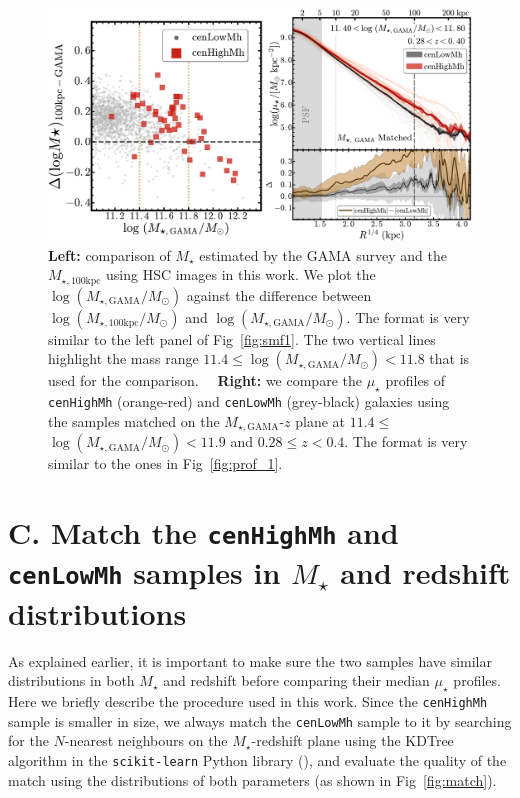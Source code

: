 \documentclass[a4paper,fleqn,usenatbib]{mnras}
\def\rbcg{\texttt{cenHighMh}}
\def\nbcg{\texttt{cenLowMh}}
\def\mstar{{$M_{\star}$}}
\def\mtot{{$M_{\star,100\mathrm{kpc}}$}}
\def\mgama{{$M_{\star,\mathrm{GAMA}}$}}
\def\logmtot{{$\log (M_{\star,100\mathrm{kpc}}/M_{\odot})$}}
\def\logmgama{{$\log (M_{\star,\mathrm{GAMA}}/M_{\odot})$}}
\def\mden{{$\mu_{\star}$}}
\begin{document}
\begin{figure}
    \centering
    \includegraphics[width=16cm]{fig/redbcg_prof_gama_new}
    \caption{
        \textbf{Left:} comparison of \mstar{} estimated by the GAMA survey and 
        the \mtot{} using HSC images in this work. 
        We plot the \logmgama{} against the difference between \logmtot{} and \logmgama{}. 
        The format is very similar to the left panel of Fig~\ref{fig:smf1}. 
        The two vertical lines highlight the mass range $11.4 \leq$\logmgama{}$<11.8$ 
        that is used for the comparison.~~
        \textbf{Right:} we compare the \mden{} profiles of \rbcg{} (orange-red) and 
        \nbcg{} (grey-black) galaxies using the samples matched on the 
        \mgama{}-$z$ plane at $11.4 \leq$\logmgama{}$<11.9$ and $0.28 \leq z < 0.4$. 
        The format is very similar to the ones in Fig~\ref{fig:prof_1}.}
    \label{fig:gama}
\end{figure}

\section{C. Match the \rbcg{} and \nbcg{} samples in \mstar{} and redshift distributions}
    \label{app:match}

    As explained earlier, it is important to make sure the two samples have similar 
    distributions in both \mstar{} and redshift before comparing their median \mden{} 
    profiles.  
    Here we briefly describe the procedure used in this work. 
    Since the \rbcg{} sample is smaller in size, we always match the \nbcg{} sample to 
    it by searching for the $N$-nearest neighbours on the $M_{\star}$-redshift plane 
    using the KDTree algorithm in the \texttt{scikit-learn} Python library 
    (\citealt{scikit-learn}), and evaluate the quality of the match using the 
    distributions of both parameters (as shown in Fig~\ref{fig:match}). 
 
\end{document}
